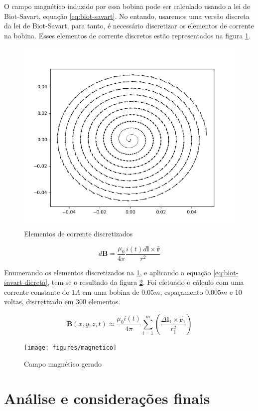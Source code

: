 \documentclass[
	article,			%
	11pt,				%
	oneside,			%
	a4paper,			%
	english,			%
	brazil,				%
	sumario=tradicional
	]{abntex2}
\begin{document}
O campo magnético induzido por essa bobina pode ser calculado usando a lei de Biot-Savart, equação \ref{eq:biot-savart}. No entando, usaremos uma versão discreta da lei de Biot-Savart, para tanto, é necessário discretizar os elementos de corrente na bobina. Esses elementos de corrente discretos estão representados na figura \ref{fig:elementosdecondutor}.

\begin{figure}[h]
	\centering
	\includegraphics[width=0.7\linewidth]{figures/elementosdecondutor}
	\caption[Elementos de corrente discretizados]{Elementos de corrente discretizados}
	\label{fig:elementosdecondutor}
\end{figure}

\begin{equation} \label{eq:biot-savart}
	d\textbf{B} = \frac{\mu_0}{4\pi} \frac{i(t)d\textbf{l} \times \hat{\textbf{r}}}{r^2}
\end{equation}

Enumerando os elementos discretizados na \ref{fig:elementosdecondutor}, e aplicando a equação \ref{eq:biot-savart-dicreta}, tem-se o resultado da figura \ref{fig:magnetico}. Foi efetuado o cálculo com uma corrente constante de $ 1 A $ em uma bobina de $ 0.05 m $, espaçamento $ 0.005 m $ e 10 voltas, discretizado em 300 elementos.

\begin{equation} \label{eq:biot-savart-dicreta}
	\textbf{B}(x, y, z, t) \approx \frac{\mu_0i(t)}{4\pi} \sum_{i = 1}^{m} \left( \frac{\Delta\textbf{l}_1 \times \hat{\textbf{r}_1}}{r_1^2} \right)
\end{equation}

\begin{figure}[h]
	\centering
	\texttt{[image: figures/magnetico]}
	\caption[Campo magnético gerado]{Campo magnético gerado}
	\label{fig:magnetico}
\end{figure}


\section{Análise e considerações finais}




\end{document}
